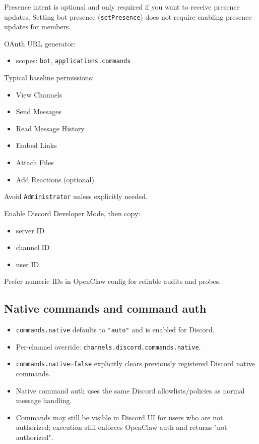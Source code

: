 Presence intent is optional and only required if you want to receive presence updates. Setting bot presence (\texttt{setPresence}) does not require enabling presence updates for members.


OAuth URL generator:

\begin{itemize}
  \item scopes: \texttt{bot}, \texttt{applications.commands}
\end{itemize}


Typical baseline permissions:

\begin{itemize}
  \item View Channels
  \item Send Messages
  \item Read Message History
  \item Embed Links
  \item Attach Files
  \item Add Reactions (optional)
\end{itemize}


Avoid \texttt{Administrator} unless explicitly needed.


Enable Discord Developer Mode, then copy:

\begin{itemize}
  \item server ID
  \item channel ID
  \item user ID
\end{itemize}


Prefer numeric IDs in OpenClaw config for reliable audits and probes.


\subsection{Native commands and command auth}


\begin{itemize}
  \item \texttt{commands.native} defaults to \texttt{"auto"} and is enabled for Discord.
  \item Per-channel override: \texttt{channels.discord.commands.native}.
  \item \texttt{commands.native=false} explicitly clears previously registered Discord native commands.
  \item Native command auth uses the same Discord allowlists/policies as normal message handling.
  \item Commands may still be visible in Discord UI for users who are not authorized; execution still enforces OpenClaw auth and returns "not authorized".
\end{itemize}


